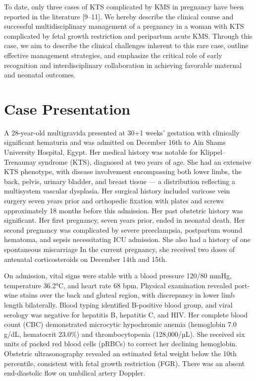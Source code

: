 \documentclass[
  letterpaper,
  DIV=11,
  numbers=noendperiod]{scrartcl}
\begin{document}
To date, only three cases of KTS complicated by KMS in pregnancy have
been reported in the literature {[}9--11{]}. We hereby describe the
clinical course and successful multidisciplinary management of a
pregnancy in a woman with KTS complicated by fetal growth restriction
and peripartum acute KMS. Through this case, we aim to describe the
clinical challenges inherent to this rare case, outline effective
management strategies, and emphasize the critical role of early
recognition and interdisciplinary collaboration in achieving favorable
maternal and neonatal outcomes.

\section{Case Presentation}\label{case-presentation}

A 28-year-old multigravida presented at 30+1 weeks' gestation with
clinically significant hematuria and was admitted on December 16th to
Ain Shams University Hospital, Egypt. Her medical history was notable
for Klippel--Trenaunay syndrome (KTS), diagnosed at two years of age.
She had an extensive KTS phenotype, with disease involvement
encompassing both lower limbs, the back, pelvis, urinary bladder, and
breast tissue --- a distribution reflecting a multisystem vascular
dysplasia. Her surgical history included varicose vein surgery seven
years prior and orthopedic fixation with plates and screws approximately
18 months before this admission. Her past obstetric history was
significant. Her first pregnancy, seven years prior, ended in neonatal
death. Her second pregnancy was complicated by severe preeclampsia,
postpartum wound hematoma, and sepsis necessitating ICU admission. She
also had a history of one spontaneous miscarriage In the current
pregnancy, she received two doses of antenatal corticosteroids on
December 14th and 15th.

On admission, vital signs were stable with a blood pressure 120/80 mmHg,
temperature 36.2°C, and heart rate 68 bpm. Physical examination revealed
port-wine stains over the back and gluteal region, with discrepancy in
lower limb length bilaterally. Blood typing identified B-positive blood
group, and viral serology was negative for hepatitis B, hepatitis C, and
HIV. Her complete blood count (CBC) demonstrated microcytic hypochromic
anemia (hemoglobin 7.0 g/dL, hematocrit 23.0\%) and thrombocytopenia
(128,000/µL). She received six units of packed red blood cells (pRBCs)
to correct her declining hemoglobin. Obstetric ultrasonography revealed
an estimated fetal weight below the 10th percentile, consistent with
fetal growth restriction (FGR). There was an absent end-diastolic flow
on umbilical artery Doppler.
\end{document}
